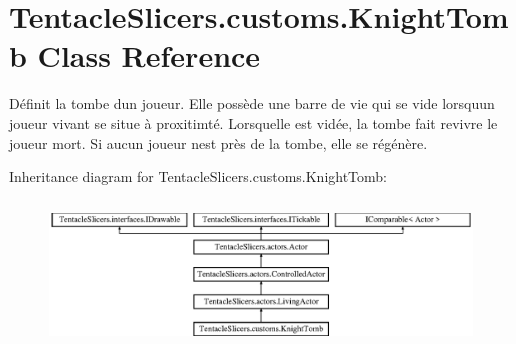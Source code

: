 \hypertarget{class_tentacle_slicers_1_1customs_1_1_knight_tomb}{}\section{Tentacle\+Slicers.\+customs.\+Knight\+Tomb Class Reference}
\label{class_tentacle_slicers_1_1customs_1_1_knight_tomb}


Définit la tombe d\textquotesingle{}un joueur. Elle possède une barre de vie qui se vide lorsqu\textquotesingle{}un joueur vivant se situe à proxitimté. Lorsqu\textquotesingle{}elle est vidée, la tombe fait revivre le joueur mort. Si aucun joueur n\textquotesingle{}est près de la tombe, elle se régénère.  


Inheritance diagram for Tentacle\+Slicers.\+customs.\+Knight\+Tomb\+:\begin{figure}[H]
\begin{center}
\leavevmode
\includegraphics[height=3.905160cm]{class_tentacle_slicers_1_1customs_1_1_knight_tomb}
\end{center}
\end{figure}
